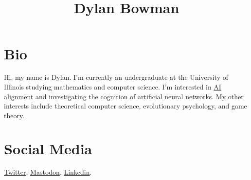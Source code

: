 \documentclass[a4paper]{article}
\date{}
\author{}
\title{Dylan Bowman}
\begin{document}
\maketitle

\section{Bio}

Hi, my name is Dylan. I'm currently an undergraduate at the 
University of Illinois studying mathematics and computer 
science. I'm interested in \href{https://en.wikipedia.org/wiki/AI_alignment}{AI alignment} 
and investigating the cognition of artificial neural networks.
My other interests include theoretical computer science, evolutionary
psychology, and game theory.

\section{Social Media}
\href{https://twitter.com/Shark_Academia}{Twitter},
\href{https://mas.to/@dbow}{Mastodon},
\href{https://www.linkedin.com/in/dylan-bowman-68a56218b/}{Linkedin}.
\end{document}
